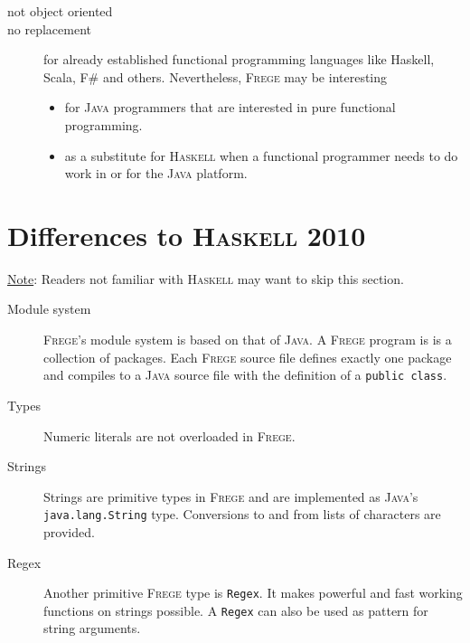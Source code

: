 \documentclass[letterpaper,12pt]{report}
\newcommand{\boxquote}[3]{
\begin{center}
\colorbox{#1}%
{\parbox{0.9\textwidth}{
\sf
\underline{#2}:
#3
}}
\end{center}}
\newcommand{\note}[1]{\boxquote{grau}{Note}{#1}}
\newcommand{\haskell}[0]{\textsc{Haskell}}
\newcommand{\frege}[0]{\textsc{Frege}}
\newcommand{\java}[0]{\textsc{Java}}
\begin{document}
\begin{description}

\item[not object oriented]

\item[no replacement]

for already established functional programming languages like Haskell,
Scala, F\# and others.
Nevertheless, \frege{} may be interesting
\begin{itemize}
\item for \java{} programmers that are interested in pure functional programming. 
\item as a substitute for \haskell{} when a functional programmer needs to do work in or for the \java{} platform. 
\end{itemize}

\end{description}

\section{Differences to \haskell{} 2010}

\note{Readers not familiar with \haskell{} may want to skip this
section.}

\begin{description}
\item[Module system]
\frege{}'s module system is based on that of \java{}. A \frege{}
program is is a collection of packages. Each \frege{}
source file defines exactly one package
and compiles to a \java{} source file with the definition of a
\texttt{public class}.


\item[Types]

Numeric literals are not overloaded in \frege{}. 

\item[Strings]
Strings are primitive types in \frege{} and are implemented
as \java{}'s \texttt{java.lang.String} type.
Conversions to and
from lists of characters are provided.

\item[Regex]
\par Another primitive \frege{} type is \texttt{Regex}. It makes
powerful
and fast working functions on strings possible. A \texttt{Regex} can
also
be used as pattern for string arguments.

\end{description}
\end{document}

